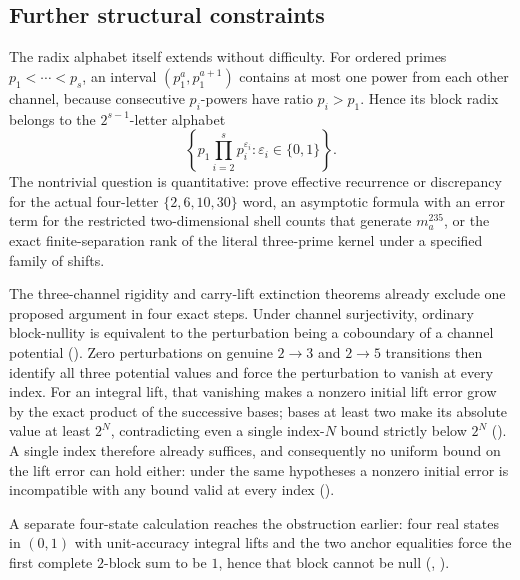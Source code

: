 \subsection{Further structural constraints}

The radix alphabet itself extends without difficulty.  For ordered primes
$p_1<\cdots<p_s$, an interval $(p_1^a,p_1^{a+1})$ contains at most one power
from each other channel, because consecutive $p_i$-powers have ratio
$p_i>p_1$.  Hence its block radix belongs to the $2^{s-1}$-letter alphabet
\[
 \left\{p_1\prod_{i=2}^s p_i^{\varepsilon_i}:
   \varepsilon_i\in\{0,1\}\right\}.
\]
The nontrivial question is quantitative: prove effective recurrence or
discrepancy for the actual four-letter $\{2,6,10,30\}$ word, an asymptotic
formula with an error term for the restricted two-dimensional shell counts
that generate $m_a^{235}$, or the exact finite-separation rank of the literal
three-prime kernel under a specified family of shifts.

The three-channel rigidity and carry-lift extinction theorems already exclude
one proposed argument in four exact steps.  Under channel surjectivity, ordinary
block-nullity is equivalent to the perturbation being a coboundary of a
channel potential
().  Zero perturbations on genuine $2\to3$ and $2\to5$ transitions
then identify all three potential values and force the perturbation to vanish
at every index.  For an integral lift, that vanishing makes a nonzero initial
lift error grow by the exact product of the successive bases; bases at least
two make its absolute value at least $2^N$, contradicting even a single
index-$N$ bound strictly below $2^N$
().  A single index therefore already suffices, and consequently no
uniform bound on the lift error can hold either: under the same hypotheses a
nonzero initial error is incompatible with any bound valid at every index
().

A separate four-state calculation reaches the obstruction earlier: four real
states in $(0,1)$ with unit-accuracy integral lifts and the two anchor
equalities force the first complete $2$-block sum to be $1$, hence that block
cannot be null
(,
).

